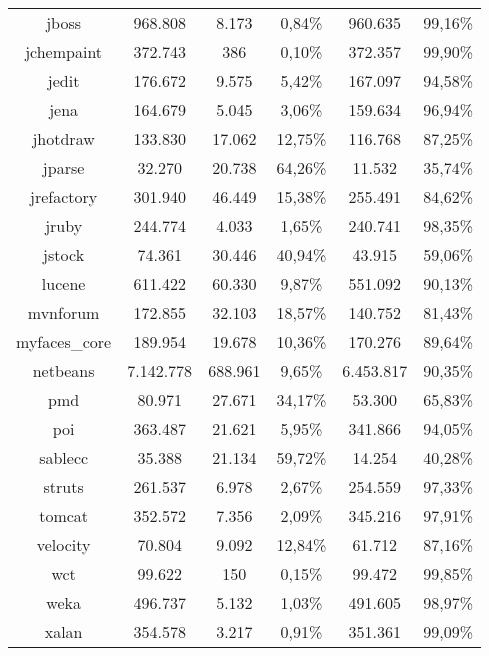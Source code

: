 \begin{table}
\begin{tabularx}{\textwidth}{c|c|c|c|c|c}
		jboss & 968.808 & 8.173 & 0,84\% & 960.635 & 99,16\% \\
		jchempaint & 372.743 & 386 & 0,10\% & 372.357 & 99,90\% \\
		jedit & 176.672 & 9.575 & 5,42\% & 167.097 & 94,58\% \\
		jena & 164.679 & 5.045 & 3,06\% & 159.634 & 96,94\% \\
		jhotdraw & 133.830 & 17.062 & 12,75\% & 116.768 & 87,25\% \\
		jparse & 32.270 & 20.738 & 64,26\% & 11.532 & 35,74\% \\
		jrefactory & 301.940 & 46.449 & 15,38\% & 255.491 & 84,62\% \\
		jruby & 244.774 & 4.033 & 1,65\% & 240.741 & 98,35\% \\
		jstock & 74.361 & 30.446 & 40,94\% & 43.915 & 59,06\% \\
		lucene & 611.422 & 60.330 & 9,87\% & 551.092 & 90,13\% \\
		mvnforum & 172.855 & 32.103 & 18,57\% & 140.752 & 81,43\% \\
		myfaces\_core & 189.954 & 19.678 & 10,36\% & 170.276 & 89,64\% \\
		netbeans & 7.142.778 & 688.961 & 9,65\% & 6.453.817 & 90,35\% \\
		pmd & 80.971 & 27.671 & 34,17\% & 53.300 & 65,83\% \\
		poi & 363.487 & 21.621 & 5,95\% & 341.866 & 94,05\% \\
		sablecc & 35.388 & 21.134 & 59,72\% & 14.254 & 40,28\% \\
		struts & 261.537 & 6.978 & 2,67\% & 254.559 & 97,33\% \\
		tomcat & 352.572 & 7.356 & 2,09\% & 345.216 & 97,91\% \\
		velocity & 70.804 & 9.092 & 12,84\% & 61.712 & 87,16\% \\
		wct & 99.622 & 150 & 0,15\% & 99.472 & 99,85\% \\
		weka & 496.737 & 5.132 & 1,03\% & 491.605 & 98,97\% \\
		xalan & 354.578 & 3.217 & 0,91\% & 351.361 & 99,09\% \\
	\end{tabularx}
\end{table}
\setlength{\extrarowheight}{0em}